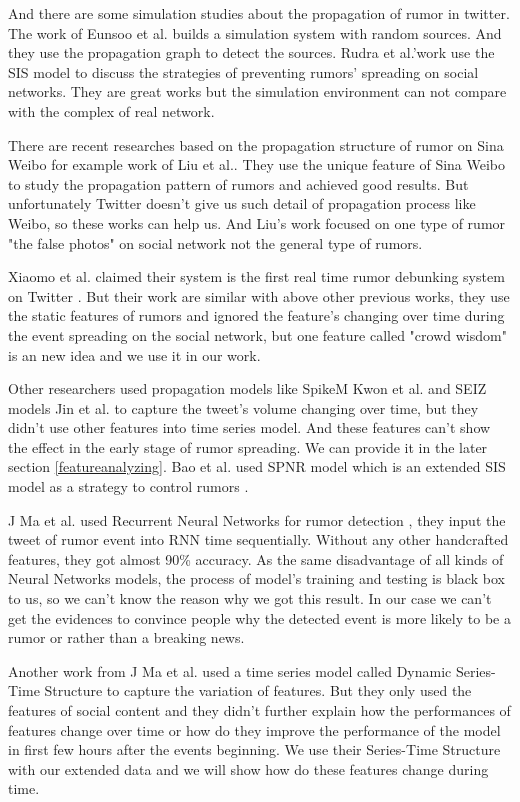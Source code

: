 And there are some simulation studies about the propagation of rumor in twitter. The work of Eunsoo et al.  \cite{seo2012identifying} builds a simulation system with random sources. And they use the propagation graph to detect the sources. Rudra et al.'work \cite{tripathy2010study} use the SIS model to discuss the strategies of preventing rumors' spreading on social networks. They are great works but the simulation environment can not compare with the complex of real network.

There are recent researches based on the propagation structure of rumor on Sina Weibo for example work of Liu et al.\cite{wu2015false}. They use the unique feature of Sina Weibo to study the propagation pattern of rumors and achieved good results. But unfortunately Twitter doesn't give us such detail of propagation process like Weibo, so these works can help us.  And Liu's work \cite{wu2015false} focused on one type of rumor "the false photos" on social network not the general type of rumors.  

Xiaomo et al. claimed their system is the first real time rumor debunking system on Twitter \cite{liu2015real}. But their work are similar with above other previous works, they use the static features of rumors and ignored the feature's changing over time during the event spreading on the social network, but one feature called "crowd wisdom" is an new idea and we use it in our work.


Other researchers used propagation models like SpikeM \cite{kwon2013prominent} Kwon et al. and SEIZ models \cite{jin2013epidemiological} Jin et al. to capture the tweet's volume changing over time, but they didn't use other features into time series model. And these features can't show the effect in the early stage of rumor spreading. We can provide it in the later section \ref{featureanalyzing}. Bao et al. used SPNR model which is an extended SIS model as a strategy to control rumors \cite{bao2013new}. 

J Ma et al. used Recurrent Neural Networks for rumor detection \cite{madetecting}, they input the tweet of rumor event into RNN time sequentially. Without any other   handcrafted features, they got almost 90\% accuracy.
As the same disadvantage of all kinds of Neural Networks models, the process of model's training and testing is black box to us, so we can't know the reason why we got this result. In our case we can't get the evidences to convince people why the detected event is more likely to be a rumor or rather than a breaking news. 

Another work from J Ma et al. used a time series model called Dynamic Series-Time Structure \cite{ma2015detect} to capture the variation of features. But they only used the features of social content and they didn't further explain how the performances of features change over time or how do they improve the performance of the model in first few hours after the events beginning.  We use their Series-Time Structure with our extended data and we will show how do these features change during time. 

